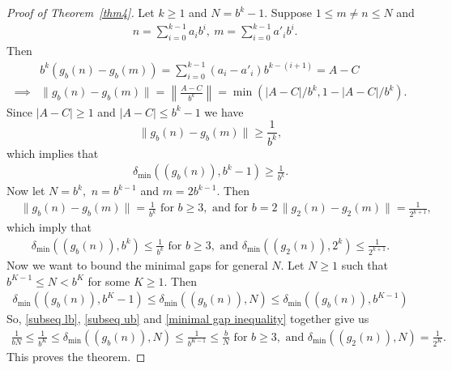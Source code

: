 \documentclass[10pt,a4paper]{amsart}
\begin{document}
	\begin{proof}[Proof of Theorem~\ref{thm4}]
		Let $k\geq1$ and $N=b^k-1.$ Suppose $1\leq m\neq n\leq N$ and
		\begin{align*}
			&n=\sum_{i=0}^{k-1}a_ib^i,\:m=\sum_{i=0}^{k-1}a'_ib^i.
		\end{align*}
		Then
		\begin{align*}
			&b^k(g_b(n)-g_b(m))=\sum_{i=0}^{k-1}(a_i-a'_i)b^{k-(i+1)}=A-C\\
			\implies&\|g_b(n)-g_b(m)\|=\left\|\frac{A-C}{b^k}\right\|=\min(|A-C|/b^k,1-|A-C|/b^k).
		\end{align*}
		Since $|A-C|\geq 1$ and $|A-C|\leq b^k-1$ we have
		\[\|g_b(n)-g_b(m)\|\geq\frac{1}{b^k},\]
		which implies that 
		\begin{align}\label{subseq lb}
			\delta_{\text{min}}((g_b(n)),b^k-1)\geq \frac{1}{b^k}.
		\end{align}
		Now let $N=b^k,$ $n=b^{k-1}$ and $m=2b^{k-1}.$ Then 
		\begin{align*}
			&\|g_b(n)-g_b(m)\|=\frac{1}{b^k} \text{ for }b\geq 3,
			\text{ and for } b=2\,\|g_2(n)-g_2(m)\|=\frac{1}{2^{k+1}},
		\end{align*}
		which imply that 
		\begin{align}\label{subseq ub}
			\delta_{\text{min}}((g_b(n)),b^k)\leq \frac{1}{b^k}\text{ for }b\geq 3,\text{ and }
			\delta_{\text{min}}((g_2(n)),2^k)\leq \frac{1}{2^{k+1}}.
		\end{align}
		Now we want to bound the minimal gaps for general $N.$
		Let $N\geq 1$ such that $b^{K-1}\leq N<b^K$ for some $K\geq 1.$ Then 
		\begin{align}\label{minimal gap inequality}
			\delta_{\text{min}}((g_b(n)),b^K-1)\leq\delta_{\text{min}}((g_b(n)),N)\leq\delta_{\text{min}}((g_b(n)),b^{K-1})
		\end{align}
		So, \eqref{subseq lb}, \eqref{subseq ub} and \eqref{minimal gap inequality} together give us
		\begin{align*}
			\frac{1}{bN}\leq\frac{1}{b^K}\leq\delta_{\text{min}}((g_b(n)),N)\leq\frac{1}{b^{K-1}}\leq\frac{b}{N}\text{ for $b\geq 3,$ and }\delta_{\text{min}}((g_2(n)),N)=\frac{1}{2^{K}}.
		\end{align*}
		This proves the theorem.
	\end{proof}
\end{document}
